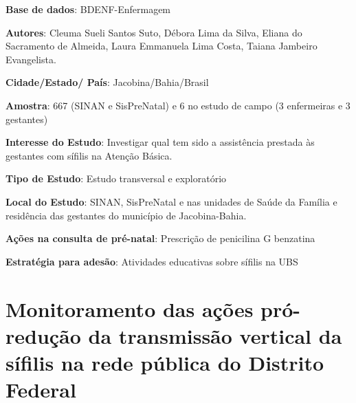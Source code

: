 \begin{description}
\item \textbf{Base de dados}: BDENF-Enfermagem
\item \textbf{Autores}: Cleuma Sueli Santos Suto, Débora Lima da Silva, Eliana do Sacramento de Almeida, Laura Emmanuela Lima Costa, Taiana Jambeiro Evangelista.
\item \textbf{Cidade/Estado/ País}: Jacobina/Bahia/Brasil
\item \textbf{Amostra}: 667 (SINAN e SisPreNatal) e 6 no estudo de campo (3 enfermeiras e 3 gestantes)
\item \textbf{Interesse do Estudo}: Investigar qual tem sido a assistência prestada às gestantes com sífilis na Atenção Básica.
\item \textbf{Tipo de Estudo}: Estudo transversal e exploratório
\item \textbf{Local do Estudo}: SINAN, SisPreNatal e nas unidades de Saúde da Família e residência das gestantes do município de Jacobina-Bahia.
\item \textbf{Ações na consulta de pré-natal}: Prescrição de penicilina G benzatina
\item \textbf{Estratégia para adesão}: Atividades educativas sobre sífilis na UBS
\end{description}

\section{Monitoramento das ações pró-redução da transmissão vertical da sífilis na rede pública do Distrito Federal \cite{tavares2012monitoramento}}

